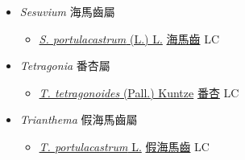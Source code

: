 
  \begin{itemize}
 \item[] \textit{Sesuvium} 海馬齒屬
                    
  \begin{itemize}
        \item[] \href{http://www.theplantlist.org/tpl1.1/search?q=Sesuvium+portulacastrum}{\textit{S. portulacastrum} (L.) L.}   \href{\detokenize{http://taibnet.sinica.edu.tw/chi/taibnet_species_list.php?T2=海馬齒&T2_new_value=true&fr=y}}{海馬齒} LC
  \end{itemize}
 \item[] \textit{Tetragonia} 番杏屬
                    
  \begin{itemize}
        \item[] \href{http://www.theplantlist.org/tpl1.1/search?q=Tetragonia+tetragonoides}{\textit{T. tetragonoides} (Pall.) Kuntze}   \href{\detokenize{http://taibnet.sinica.edu.tw/chi/taibnet_species_list.php?T2=番杏&T2_new_value=true&fr=y}}{番杏} LC
  \end{itemize}
 \item[] \textit{Trianthema} 假海馬齒屬
                    
  \begin{itemize}
        \item[] \href{http://www.theplantlist.org/tpl1.1/search?q=Trianthema+portulacastrum}{\textit{T. portulacastrum} L.}   \href{\detokenize{http://taibnet.sinica.edu.tw/chi/taibnet_species_list.php?T2=假海馬齒&T2_new_value=true&fr=y}}{假海馬齒} LC
  \end{itemize}
  \end{itemize}
